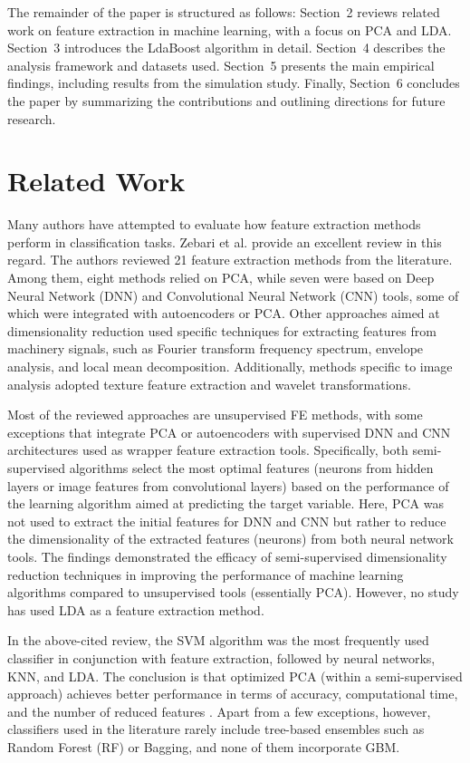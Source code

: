 \documentclass[11pt,a4paper]{article}
\begin{document}
The remainder of the paper is structured as follows: Section~2 reviews related work on feature extraction in machine learning, with a focus on PCA and LDA. Section~3 introduces the LdaBoost algorithm in detail. Section~4 describes the analysis framework and datasets used. Section~5 presents the main empirical findings, including results from the simulation study. Finally, Section~6 concludes the paper by summarizing the contributions and outlining directions for future research.


\section{Related Work}
Many authors have attempted to evaluate how feature extraction methods perform in classification tasks. Zebari et al. \citep{zebari2020comprehensive} provide an excellent review in this regard.  
The authors reviewed 21 feature extraction methods from the literature. Among them, eight methods relied on PCA, while seven were based on Deep Neural Network (DNN) and Convolutional Neural Network (CNN) tools, some of which were integrated with autoencoders or PCA.  
Other approaches aimed at dimensionality reduction used specific techniques for extracting features from machinery signals, such as Fourier transform frequency spectrum, envelope analysis, and local mean decomposition. Additionally, methods specific to image analysis adopted texture feature extraction and wavelet transformations.

Most of the reviewed approaches are unsupervised FE methods, with some exceptions that integrate PCA or autoencoders with supervised DNN and CNN architectures used as wrapper feature extraction tools. Specifically, both semi-supervised algorithms select the most optimal features (neurons from hidden layers or image features from convolutional layers) based on the performance of the learning algorithm aimed at predicting the target variable.  
Here, PCA was not used to extract the initial features for DNN and CNN but rather to reduce the dimensionality of the extracted features (neurons) from both neural network tools.  
The findings demonstrated the efficacy of semi-supervised dimensionality reduction techniques in improving the performance of machine learning algorithms compared to unsupervised tools (essentially PCA).  
However, no study has used LDA as a feature extraction method.

In the above-cited review, the SVM algorithm was the most frequently used classifier in conjunction with feature extraction, followed by neural networks, KNN, and LDA.  
The conclusion is that optimized PCA (within a semi-supervised approach) achieves better performance in terms of accuracy, computational time, and the number of reduced features \citep{ma2019dimension, zebari2020comprehensive}.  
Apart from a few exceptions, however, classifiers used in the literature rarely include tree-based ensembles such as Random Forest (RF) or Bagging, and none of them incorporate GBM.
\end{document}
